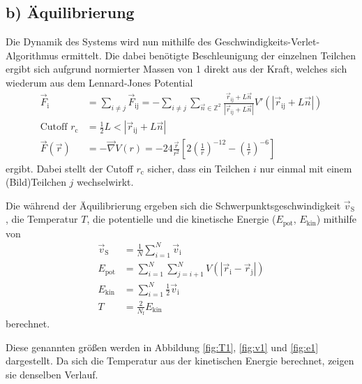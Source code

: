 \FloatBarrier
\subsection*{b) Äquilibrierung}

Die Dynamik des Systems wird nun mithilfe des Geschwindigkeits-Verlet-Algorithmus ermittelt.
Die dabei benötigte Beschleunigung der einzelnen Teilchen ergibt sich aufgrund normierter Massen von 1
direkt aus der Kraft, welches sich wiederum aus dem Lennard-Jones Potential
\begin{align*}
    \vec{F}_\text{i}
    &= \sum_{i \neq j} \vec{F}_\text{ij}
    = - \sum_{i \neq j} \sum_{\vec{n} \in \mathbb{Z}^2}
        \frac{\vec{r}_\text{ij} + L \vec{n}}{\left|\vec{r}_\text{ij} + L \vec{n}\right|}
        V'\left(\left|\vec{r}_\text{ij} + L \vec{n}\right|\right) \\
    \text{Cutoff } r_\text{c}
    &= \frac{1}{2} L < \left|\vec{r}_\text{ij} + L \vec{n}\right| \\
    \vec{F}\!\left(\vec{r}\right)
    &= - \vec{\nabla} V\left(r\right)
    = - 24 \frac{\vec{r}}{r^2}
        \left[2 \left(\frac{1}{r}\right)^{-12} - \left(\frac{1}{r}\right)^{-6}\right]
\end{align*}
ergibt.
Dabei stellt der Cutoff $r_\text{c}$ sicher, dass ein Teilchen $i$ nur einmal mit einem (Bild)Teilchen $j$
wechselwirkt.

Die während der Äquilibrierung ergeben sich die Schwerpunktsgeschwindigkeit $\vec{v}_\text{S}$,
die Temperatur $T$, die potentielle und die kinetische Energie
($E_\text{pot}$, $E_\text{kin}$) mithilfe von
\begin{align*}
    \vec{v}_\text{S} &= \frac{1}{N} \sum_{i=1}^N \vec{v}_\text{i} \\
    E_\text{pot} &= \sum_{i=1}^N \sum_{j=i+1}^N
        V\!\left(\left|\vec{r}_\text{i} - \vec{r}_\text{j}\right|\right) \\
    E_\text{kin} &= \sum_{i=1}^N \frac{1}{2} \vec{v}_\text{i} \\
    T &= \frac{2}{N_\text{f}} E_\text{kin}
\end{align*}
berechnet.

Diese genannten größen werden in Abbildung \ref{fig:T1}, \ref{fig:v1} und \ref{fig:e1}
dargestellt. Da sich die Temperatur aus der kinetischen Energie berechnet, zeigen sie
denselben Verlauf.


